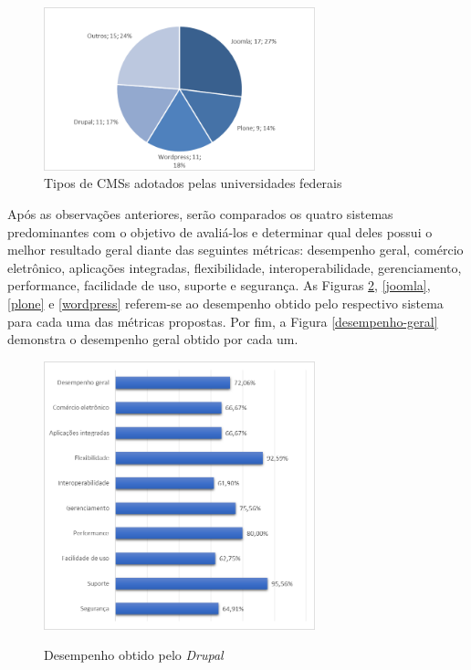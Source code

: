 \begin{figure}[htb]
 \centering
 \caption{Tipos de CMSs adotados pelas universidades federais}
 \includegraphics[width=0.7\textwidth]{figuras/tipos-de-cms}
 
 
 \label{cms-universidade-adocao}
\end{figure}

\newpage
Após as observações anteriores, serão comparados os quatro sistemas predominantes com o objetivo de avaliá-los e determinar qual deles possui o melhor resultado geral diante das seguintes métricas: desempenho geral, comércio eletrônico, aplicações integradas, flexibilidade, interoperabilidade, gerenciamento, performance, facilidade de uso, suporte e segurança. As Figuras \ref{drupal}, \ref{joomla}, \ref{plone} e \ref{wordpress} referem-se ao desempenho obtido pelo respectivo sistema para cada uma das métricas propostas. Por fim, a Figura \ref{desempenho-geral} demonstra o desempenho geral obtido por cada um.

\newpage

\begin{figure}[htb]
 \centering
 \caption{Desempenho obtido pelo \textit{Drupal}}
 \includegraphics[width=0.7\textwidth]{figuras/desempenho-drupal}
 \label{drupal}
\end{figure}

